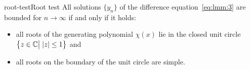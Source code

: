 \begin{Corollary*}{root-test}{Root test}
  All solutions $\{y_n\}$ of the difference equation~\eqref{eq:lmm:3}
  are bounded for $n\to\infty$ if and only if it holds:
  \begin{itemize}
  \item all roots of the generating polynomial $\chi(x)$
    lie in the closed unit circle $\bigl\{z\in \mathbb C \big|\; |z|\le
    1\bigr\}$ and
  \item all roots on the boundary of the unit circle are simple.
  \end{itemize}
\end{Corollary*}

